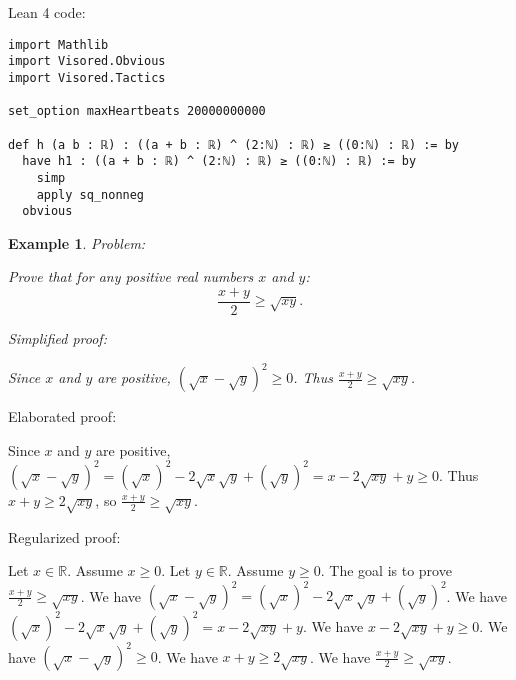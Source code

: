 \documentclass{article}
\newtheorem{example}{Example}
\begin{document}
Lean 4 code:
\begin{tcolorbox}[colback=white!10, width=\linewidth]
\begin{lstlisting}[language=Lean4]
import Mathlib
import Visored.Obvious
import Visored.Tactics

set_option maxHeartbeats 20000000000

def h (a b : ℝ) : ((a + b : ℝ) ^ (2:ℕ) : ℝ) ≥ ((0:ℕ) : ℝ) := by
  have h1 : ((a + b : ℝ) ^ (2:ℕ) : ℝ) ≥ ((0:ℕ) : ℝ) := by
    simp
    apply sq_nonneg
  obvious

\end{lstlisting}
\end{tcolorbox}


\begin{example}
Problem:
\begin{tcolorbox}[colback=yellow!10, width=\linewidth]
Prove that for any positive real numbers $x$ and $y$:
    $$\frac{x+y}{2} \geq \sqrt{xy}.$$
\end{tcolorbox}

Simplified proof:
\begin{tcolorbox}[colback=blue!10, width=\linewidth]
Since $x$ and $y$ are positive, $(\sqrt x - \sqrt y)^2 \ge 0$. Thus $\frac{x+y}{2} \ge \sqrt{xy}$.
\end{tcolorbox}
\end{example}

Elaborated proof:
\begin{tcolorbox}[colback=green!10, width=\linewidth]
Since $x$ and $y$ are positive, $(\sqrt x - \sqrt y)^2 = (\sqrt x)^2 - 2\sqrt x \sqrt y + (\sqrt y)^2 = x - 2\sqrt{xy} + y \ge 0$. Thus $x + y \ge 2\sqrt{xy}$, so $\frac{x+y}{2} \ge \sqrt{xy}$.
\end{tcolorbox}

Regularized proof:
\begin{tcolorbox}[colback=red!10, width=\linewidth]
Let $x\in\mathbb{R}$. Assume $x\ge 0$.
Let $y\in\mathbb{R}$. Assume $y\ge 0$.
The goal is to prove $\frac{x+y}{2} \ge \sqrt{xy}$.
We have ${{(\sqrt x - \sqrt y)}}^2 = {{(\sqrt x)}}^2 - 2\sqrt x \sqrt y + {{(\sqrt y)}}^2$.
We have ${{(\sqrt x)}}^2 - 2\sqrt x \sqrt y + {{(\sqrt y)}}^2 = x - 2\sqrt{xy} + y$.
We have $x - 2\sqrt{xy} + y \ge 0$.
We have ${{(\sqrt x - \sqrt y)}}^2 \ge 0$.
We have $x + y \ge 2\sqrt{xy}$.
We have $\frac{x+y}{2} \ge \sqrt{xy}$.
\end{tcolorbox}
\end{document}
